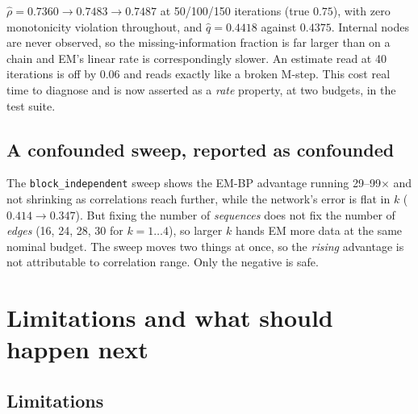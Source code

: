 \documentclass[11pt]{article}
\theoremstyle{remark}
\newcommand{\code}[1]{\texttt{\small #1}}
\begin{document}
$\hat\rho = 0.7360 \to 0.7483 \to 0.7487$ at 50/100/150 iterations (true
$0.75$), with zero monotonicity violation throughout, and $\hat q = 0.4418$
against $0.4375$. Internal nodes are never observed, so the missing-information
fraction is far larger than on a chain and EM's linear rate is correspondingly
slower. An estimate read at 40 iterations is off by 0.06 and reads exactly like
a broken M-step. This cost real time to diagnose and is now asserted as a
\emph{rate} property, at two budgets, in the test suite.

\subsection{A confounded sweep, reported as confounded}

The \code{block\_independent} sweep shows the EM-BP advantage running
29--99$\times$ and not shrinking as correlations reach further, while the
network's error is flat in $k$ ($0.414 \to 0.347$). But fixing the number of
\emph{sequences} does not fix the number of \emph{edges} (16, 24, 28, 30 for
$k=1\dots4$), so larger $k$ hands EM more data at the same nominal budget. The
sweep moves two things at once, so the \emph{rising} advantage is not
attributable to correlation range. Only the negative is safe.

\section{Limitations and what should happen next}
\label{sec:limits}

\subsection{Limitations}
\end{document}

